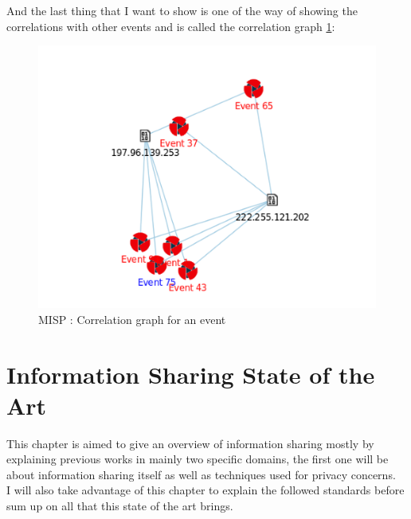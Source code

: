 \documentclass{eplmastersthesis}
\begin{document}
And the last thing that I want to show is one of the way of showing the correlations with other events and is called the correlation graph \ref{webcorrelation}:
\begin{figure}[!h]
	\begin{center}
		\includegraphics[scale=0.35]{res/webCorrelationGraph}
		\caption{MISP : Correlation graph for an event}
		\label{webcorrelation}
	\end{center}
\end{figure}



\chapter{Information Sharing State of the Art}

This chapter is aimed to give an overview of information sharing mostly by explaining previous works in mainly two specific domains, the first one will be about information sharing itself as well as techniques used for privacy concerns.\\
I will also take advantage of this chapter to explain the followed standards before sum up on all that this state of the art brings.
\end{document}
